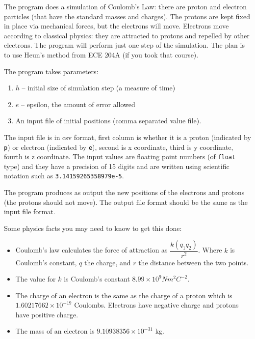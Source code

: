 \documentclass[letterpaper,10pt]{article}
\begin{document}
The program does a simulation of Coulomb's Law: there are proton and electron particles (that have the standard masses and charges). The protons are kept fixed in place via mechanical forces, but the electrons will move. Electrons move according to classical physics: they are attracted to protons and repelled by other electrons. The program will perform just one step of the simulation. The plan is to use Heun's method from ECE 204A (if you took that course).

The program takes parameters:
\begin{enumerate}
\item $h$ -- initial size of simulation step (a measure of time) 
\item $e$ -- epsilon, the amount of error allowed
\item An input file of initial positions (comma separated value file).
\end{enumerate}

The input file is in csv format, first column is whether it is a proton (indicated by \texttt{p}) or electron (indicated by \texttt{e}), second is x coordinate, third is y coordinate, fourth is z coordinate. The input values are floating point numbers (of \texttt{float} type) and they have a precision of 15 digits and are written using scientific notation such as \texttt{3.14159265358979e-5}. 

The program produces as output the new positions of the electrons and protons (the protons should not move). The output file format should be the same as the input file format.

Some physics facts you may need to know to get this done:

\begin{itemize}
\item Coulomb's law calculates the force of attraction as $\dfrac{k (q_{1} q_{2})}{r^{2}}$.  Where $k$ is Coulomb's constant, $q$ the charge, and $r$ the distance between the two points.

\item The value for $k$ is Coulomb's constant $8.99 \times 10^{9} N m^{2} C^{-2}$. 

\item The charge of an electron is the same as the charge of a proton which is $1.60217662 \times 10^{-19}$ Coulombs. Electrons have negative charge and protons have positive charge. 

\item The mass of an electron is $9.10938356 \times 10^{-31}$ kg.
\end{itemize}
\end{document}
